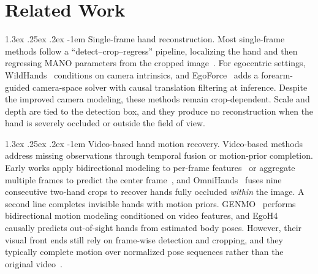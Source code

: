 \documentclass[10pt,twocolumn,letterpaper]{article}
\makeatletter
\renewcommand\paragraph{\@startsection{paragraph}{4}{\z@}%
  {1.3ex \@plus .25ex \@minus .2ex}%
  {-1em}%
  {\normalfont\normalsize\bfseries}}
\makeatother
\begin{document}
\section{Related Work}

\paragraph{Single-frame hand reconstruction.}
Most single-frame methods follow a ``detect--crop--regress'' pipeline, localizing the hand and then regressing MANO parameters from the cropped image~\citep{hamer2024,wilor2025,hamba2024,interwild2023}. For egocentric settings, WildHands~\citep{wildhands2024} conditions on camera intrinsics, and EgoForce~\citep{egoforce2026} adds a forearm-guided camera-space solver with causal translation filtering at inference. Despite the improved camera modeling, these methods remain crop-dependent. Scale and depth are tied to the detection box, and they produce no reconstruction when the hand is severely occluded or outside the field of view.

\paragraph{Video-based hand motion recovery.}
Video-based methods address missing observations through temporal fusion or motion-prior completion. Early works apply bidirectional modeling to per-frame features~\citep{vibe2020} or aggregate multiple frames to predict the center frame~\citep{tcmr2021,glot2023}, and OmniHands~\citep{omnihands2025} fuses nine consecutive two-hand crops to recover hands fully occluded \emph{within} the image. A second line completes invisible hands with motion priors. GENMO~\citep{genmo2025} performs bidirectional motion modeling conditioned on video features, and EgoH4~\citep{egoh4_2025} causally predicts out-of-sight hands from estimated body poses. However, their visual front ends still rely on frame-wise detection and cropping, and they typically complete motion over normalized pose sequences rather than the original video~\citep{mdm2023}.
\end{document}
